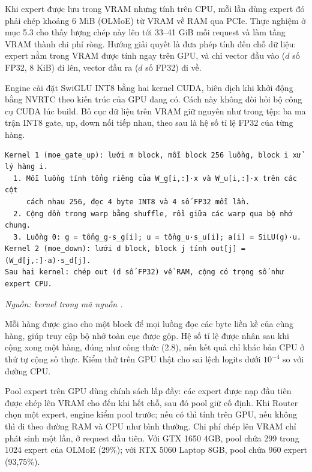 Khi expert được lưu trong VRAM nhưng tính trên CPU, mỗi lần dùng expert đó phải chép khoảng 6 MiB (OLMoE) từ VRAM về RAM qua PCIe. Thực nghiệm ở mục 5.3 cho thấy lượng chép này lên tới 33--41 GiB mỗi request và làm tầng VRAM thành chi phí ròng. Hướng giải quyết là đưa phép tính đến chỗ dữ liệu: expert nằm trong VRAM được tính ngay trên GPU, và chỉ vector đầu vào ($d$ số FP32, 8 KiB) đi lên, vector đầu ra ($d$ số FP32) đi về.

Engine cài đặt SwiGLU INT8 bằng hai kernel CUDA, biên dịch khi khởi động bằng NVRTC \cite{nvidia_nvrtc} theo kiến trúc của GPU đang có. Cách này không đòi hỏi bộ công cụ CUDA lúc build. Bố cục dữ liệu trên VRAM giữ nguyên như trong tệp: ba ma trận INT8 gate, up, down nối tiếp nhau, theo sau là hệ số tỉ lệ FP32 của từng hàng.

\begin{Verbatim}[samepage=true,breaklines=true,breakanywhere=true,fontsize=\small,frame=single,framesep=3mm]
Kernel 1 (moe_gate_up): lưới m block, mỗi block 256 luồng, block i xử lý hàng i.
  1. Mỗi luồng tính tổng riêng của W_g[i,:]·x và W_u[i,:]·x trên các cột
     cách nhau 256, đọc 4 byte INT8 và 4 số FP32 mỗi lần.
  2. Cộng dồn trong warp bằng shuffle, rồi giữa các warp qua bộ nhớ chung.
  3. Luồng 0: g = tổng_g·s_g[i]; u = tổng_u·s_u[i]; a[i] = SiLU(g)·u.
Kernel 2 (moe_down): lưới d block, block j tính out[j] = (W_d[j,:]·a)·s_d[j].
Sau hai kernel: chép out (d số FP32) về RAM, cộng có trọng số như expert CPU.
\end{Verbatim}

\textit{Nguồn: kernel trong mã nguồn \cite{moe_tierengine_arch}.}

Mỗi hàng được giao cho một block để mọi luồng đọc các byte liền kề của cùng hàng, giúp truy cập bộ nhớ toàn cục được gộp. Hệ số tỉ lệ được nhân sau khi cộng xong một hàng, đúng như công thức (2.8), nên kết quả chỉ khác bản CPU ở thứ tự cộng số thực. Kiểm thử trên GPU thật cho sai lệch logits dưới $10^{-4}$ so với đường CPU.

Pool expert trên GPU dùng chính sách lấp đầy: các expert được nạp đầu tiên được chép lên VRAM cho đến khi hết chỗ, sau đó pool giữ cố định. Khi Router chọn một expert, engine kiểm pool trước; nếu có thì tính trên GPU, nếu không thì đi theo đường RAM và CPU như bình thường. Chi phí chép lên VRAM chỉ phát sinh một lần, ở request đầu tiên. Với GTX 1650 4GB, pool chứa 299 trong 1024 expert của OLMoE (29\%); với RTX 5060 Laptop 8GB, pool chứa 960 expert (93,75\%).

